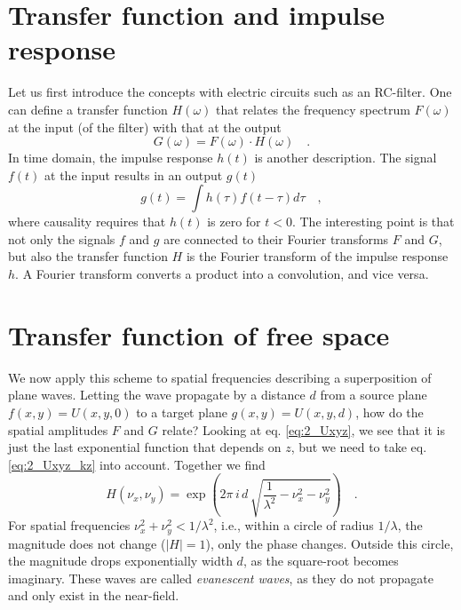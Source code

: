\section{Transfer function and impulse response}

Let us first introduce the concepts with electric  circuits such as an RC-filter. One can define a transfer function $H(\omega)$ that relates the frequency spectrum $F(\omega)$ at the input (of the filter) with that at the output 
\begin{equation}
    G(\omega) = F(\omega) \cdot H(\omega) \quad .
\end{equation}
In time domain, the impulse response $h(t)$ is another description. The signal $f(t)$ at the input results in an output $g(t)$
\begin{equation}
    g(t) = \int h(\tau) f(t - \tau) d\tau \quad ,
\end{equation}
where causality requires that $h(t)$ is zero for $t <0$. The interesting point is that not only the signals $f$ and $g$ are connected to their Fourier transforms $F$ and $G$, but also the transfer function $H$ is the Fourier transform of the impulse response $h$. A Fourier transform converts a product into a convolution, and vice versa.


\section{Transfer function of free space}

We now apply this scheme to spatial frequencies describing a superposition of plane waves. Letting the wave propagate by a distance $d$ from a source plane $f(x,y) = U(x,y,0)$ to a target plane $g(x,y) = U(x,y,d)$, how do the spatial amplitudes $F$ and $G$ relate? Looking at eq.  \ref{eq:2_Uxyz}, we see that it is just the last exponential function  that depends on $z$, but we need to take eq.  \ref{eq:2_Uxyz_kz} into account. Together we find
\begin{equation}
    H(\nu_x, \nu_y) = \exp \left(  
  2 \pi \, i  \, d \, \sqrt{ \frac{1}{\lambda^2} - \nu_x^2 - \nu_y^2 }
    \right) \quad .
\end{equation}
For spatial frequencies $\nu_x^2 + \nu_y^2 <  1/\lambda^2$, i.e., within a circle of radius $1/\lambda$, the magnitude does not change ($|H| = 1$), only the phase changes. Outside this circle, the magnitude drops exponentially width $d$, as the square-root becomes imaginary. These waves are called \emph{evanescent waves}, as they do not propagate and only exist in the near-field.

